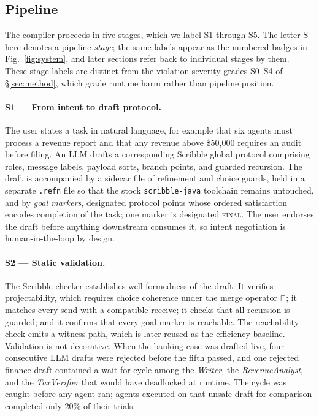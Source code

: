 \documentclass{article}
\newcommand{\merge}{\sqcap}
\begin{document}
\subsection{Pipeline}\label{sec:pipeline}
The compiler proceeds in five stages, which we label S1 through S5. The letter S here denotes a pipeline \emph{stage}; the same labels appear as the numbered badges in Fig.~\ref{fig:system}, and later sections refer back to individual stages by them. These stage labels are distinct from the violation-severity grades S0--S4 of \S\ref{sec:method}, which grade runtime harm rather than pipeline position.

\paragraph{S1 --- From intent to draft protocol.} The user states a task in natural language, for example that six agents must process a revenue report and that any revenue above \$50{,}000 requires an audit before filing. An LLM drafts a corresponding Scribble global protocol comprising roles, message labels, payload sorts, branch points, and guarded recursion. The draft is accompanied by a sidecar file of refinement and choice guards, held in a separate \texttt{.refn} file so that the stock \texttt{scribble-java} toolchain remains untouched, and by \emph{goal markers}, designated protocol points whose ordered satisfaction encodes completion of the task; one marker is designated \textsc{final}. The user endorses the draft before anything downstream consumes it, so intent negotiation is human-in-the-loop by design.

\paragraph{S2 --- Static validation.} The Scribble checker establishes well-formedness of the draft. It verifies projectability, which requires choice coherence under the merge operator $\merge$; it matches every send with a compatible receive; it checks that all recursion is guarded; and it confirms that every goal marker is reachable. The reachability check emits a witness path, which is later reused as the efficiency baseline. Validation is not decorative. When the banking case was drafted live, four consecutive LLM drafts were rejected before the fifth passed, and one rejected finance draft contained a wait-for cycle among the \textit{Writer}, the \textit{RevenueAnalyst}, and the \textit{TaxVerifier} that would have deadlocked at runtime. The cycle was caught before any agent ran; agents executed on that unsafe draft for comparison completed only 20\% of their trials.
\end{document}
